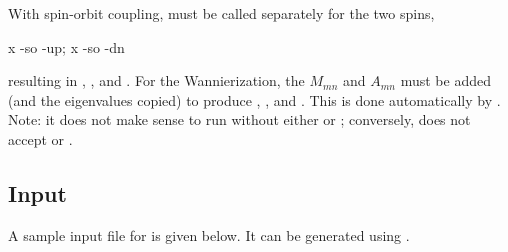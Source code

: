 With spin-orbit coupling, \wiiw must be called separately for the two
spins,
\begin{usage}
  x \wiiw -so -up; x \wiiw -so -dn
\end{usage}
resulting in , , and
.  For the Wannierization, the $M_{mn}$ and
$A_{mn}$ must be added (and the eigenvalues copied) to produce
, , and .  This is
done automatically by .  Note: it does not
make sense to run  without either  or
; conversely,  does not accept
 or .


\subsection{Input}

A sample input file for \wtow is given below. It can be generated
using \writeinwf.
%
%
\listnote

